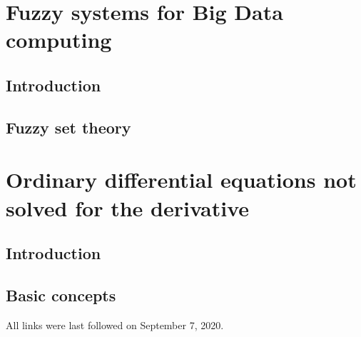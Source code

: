 \documentclass[
  fontsize=12pt,
  a4paper,  %
  twoside,  %
  bibliography=totoc,
  headsepline,
  cleardoublepage=empty,
  draft=false
]{scrbook}
\theoremstyle{nonumberplain}
\begin{document}
%
%
\mainmatter

\part{Fuzzy systems for Big Data computing}

\chapter{Introduction}
\label{chap:k1}


\chapter{Fuzzy set theory}


\part{Ordinary differential equations not solved for the derivative}

\chapter{Introduction}
\label{chap:k1}


\chapter{Basic concepts}






\printnoidxglossaries
{}
\cleardoublepage

%
%


\nocite{*}
\printbibliography

\noindent All links were last followed on September 7, 2020.
\end{document}

